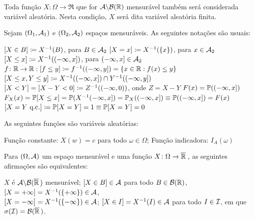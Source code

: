 \begin{note}
	Toda função $X\colon \Omega\to\Re$ que for $\Acal\backslash\Bo$ mensurável também será considerada variável aleatória. Nesta condição, $X$ será dita variável aleatória finita.
\end{note}

\begin{definition} Sejam $(\Omega_1, \Acal_1)$ e $(\Omega_2, \Acal_2)$ espaços mensuráveis. As seguintes notações são usuais:
	\begin{outline}[enumerate]
		\1 $[X \in B] \coloneq X\inv(B)$, para $B \in \Acal_2$
		\1 $[X = x] \coloneq X\inv(\{x\})$, para ${x} \in \Acal_2$
		\1 $[X \leq x] \coloneq X\inv((-\infty, x])$, para $(-\infty, x] \in \Acal_2$
		\1 \( f\colon \Re\to\Re : [f\leq y] \coloneq f\inv((-\infty, y]) = \{x \in\Re:f(x)\leq y \} \)
		\1 \( [X \leq x, Y \leq y] \coloneq X\inv((-\infty, x])\cap Y\inv((-\infty, y])\)
		\1 \([X<Y] = [X-Y<0] \coloneq Z\inv((-\infty, 0))\), onde $Z=X-Y$
		\1 \(F(x) = \P((-\infty, x])\)
		\1 \(F_X(x) = \P[X\leq x] = \P(X\inv(-\infty,x]) = \P_X((-\infty,x]) \equiv \P((-\infty, x]) = F(x)\)
		\1 \([X = Y \text{ q.c.}] \coloneq \P[X=Y]=1 \equiv \P[X=Y]=0 \)
	\end{outline}
\end{definition}

\begin{theorem} As seguintes funções são variáveis aleatórias:
	\begin{outline}[enumerate]
		\1 Função constante: $X(w)=c$ para todo $\omega\in\Omega$;
		\1 Função indicadora: $I_A(\omega)$
	\end{outline}
\end{theorem}

\begin{theorem}
		Para $(\Omega, \Acal)$ um espaço mensurável e uma função $X\colon\Omega \to \Ree$, as seguintes afirmações são equivalentes:
		\begin{outline}[enumerate]
			\1 $X$ é $\Acal\backslash\Boe$ mensurável;
			\1 \([X \in B] \in \Acal\) para todo \(B \in \Bo\), \\
			\([X=+\infty] = X\inv(\{+\infty\}) \in \Acal\), \\
			\([X=-\infty] = X\inv(\{-\infty\}) \in \Acal\);
			\1 \([X \in I] = X\inv(I) \in \Acal\) para todo $I \in \Ical$, em que $\sigma(\Ical)=\Boe$.
		\end{outline}
\end{theorem}

